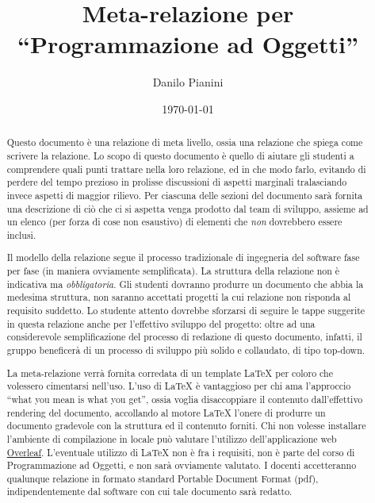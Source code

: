 \documentclass[a4paper,12pt]{report}
\title{Meta-relazione per\\``Programmazione ad Oggetti''}
\author{Danilo Pianini}
\date{\today}
\begin{document}
\maketitle

\begin{abstract}
Questo documento è una relazione di meta livello, ossia una relazione che spiega come scrivere la relazione.
%
Lo scopo di questo documento è quello di aiutare gli studenti a comprendere quali punti trattare nella loro relazione, ed in che modo farlo, evitando di perdere del tempo prezioso in prolisse discussioni di aspetti marginali tralasciando invece aspetti di maggior rilievo.
%
Per ciascuna delle sezioni del documento sarà fornita una descrizione di ciò che ci si aspetta venga prodotto dal team di sviluppo, assieme ad un elenco (per forza di cose non esaustivo) di elementi che \emph{non} dovrebbero essere inclusi.

Il modello della relazione segue il processo tradizionale di ingegneria del software fase per fase (in maniera ovviamente semplificata).
%
La struttura della relazione non è indicativa ma \textit{obbligatoria}.
%
Gli studenti dovranno produrre un documento che abbia la medesima struttura, non saranno accettati progetti la cui relazione non risponda al requisito suddetto.
%
Lo studente attento dovrebbe sforzarsi di seguire le tappe suggerite in questa relazione anche per l'effettivo sviluppo del progetto: oltre ad una considerevole semplificazione del processo di redazione di questo documento, infatti, il gruppo beneficerà di un processo di sviluppo più solido e collaudato, di tipo top-down.

La meta-relazione verrà fornita corredata di un template \LaTeX{} per coloro che volessero cimentarsi nell'uso.
%
L'uso di \LaTeX{} è vantaggioso per chi ama l'approccio ``what you mean is what you get'', ossia voglia disaccoppiare il contenuto dall'effettivo rendering del documento, accollando al motore \LaTeX{} l'onere di produrre un documento gradevole con la struttura ed il contenuto forniti.
%
Chi non volesse installare l'ambiente di compilazione in locale può valutare l'utilizzo dell'applicazione web \href{https://www.overleaf.com/}{Overleaf}.
%
L'eventuale utilizzo di \LaTeX{} non è fra i requisiti, non è parte del corso di Programmazione ad Oggetti, e non sarà ovviamente valutato. I docenti accetteranno qualunque relazione in formato standard Portable Document Format (pdf), indipendentemente dal software con cui tale documento sarà redatto.
\end{abstract}
\end{document}
